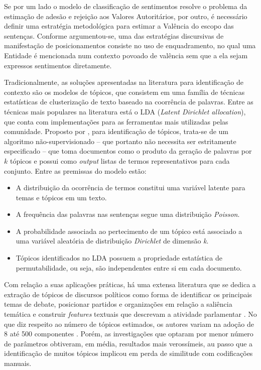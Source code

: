 \documentclass[
12pt,				%
openright,			%
twoside,			%
a4paper,			%
english,			%
french,				%
spanish,			%
brazil				%
]{abntex2}
\begin{document}
Se por um lado o modelo de classificação de sentimentos resolve o problema da estimação de adesão e rejeição aos Valores Autoritários, por outro, é necessário definir uma estratégia metodológica para estimar a Valência do escopo das sentenças. Conforme argumentou-se, uma das estratégias discursivas de manifestação de posicionamentos consiste no uso de enquadramento, no qual uma Entidade é mencionada num contexto povoado de valência sem que a ela sejam expressos sentimentos diretamente.

Tradicionalmente, as soluções apresentadas na literatura para identificação de contexto são os modelos de tópicos, que consistem em uma família de técnicas estatísticas de clusterização de texto baseado na coorrência de palavras. Entre as técnicas mais populares na literatura está o LDA (\emph{Latent Dirichlet allocation}), que conta com implementações para as ferramentas mais utilizadas pelas comunidade.  Proposto por , para identificação de tópicos, trata-se de um algoritmo não-supervisionado -- que portanto não necessita ser estritamente especificado -- que toma documentos como o produto da geração de palavras por $k$ tópicos e possui como \emph{output} listas de termos representativos para cada conjunto. Entre as premissas do modelo estão:

\begin{itemize}
	\item A distribuição da ocorrência de termos constitui uma variável latente para temas e tópicos em um texto.
	\item A frequência das palavras nas sentenças segue uma distribuição \emph{Poisson}.
	\item A probabilidade associada ao pertecimento de um tópico está associado a uma variável aleatória de distribuição \emph{Dirichlet} de dimensão \emph{k}.
	\item Tópicos identificados no LDA possuem a propriedade estatística de permutabilidade, ou seja, são independentes entre si em cada documento. 
\end{itemize}

Com relação a suas aplicações práticas, há uma extensa literatura que se dedica a extração de tópicos de discursos políticos como forma de identificar os principais temas de debate, posicionar partidos e organizações em relação a saliência temática e construir \emph{features} textuais que descrevam a atividade parlamentar \cite{chen2010opinion, fang2012mining, balasubramanyan2012modeling, balasubramanyan2012modeling, cohen2013classifying, song2014analyzing, levy2014driving, van2014lda,zirn2014multidimensional, batista2016mensurando}. No que diz respeito ao número de tópicos estimados, os autores variam na adoção de 8 até 500 componentes . Porém, as investigações que optaram por menor número de parâmetros obtiveram, em média, resultados mais verossímeis, au passo que a identificação de muitos tópicos implicou em perda de similitude com codificações manuais.
\end{document}
